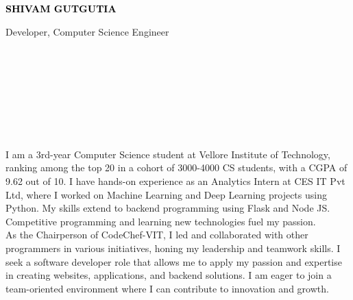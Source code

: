 \documentclass[9pt]{developercv}
\begin{document}

\begin{minipage}[t]{0.5\textwidth}
  \vspace{-\baselineskip}

  { \fontsize{16}{20} \textcolor{black}{\textbf{\MakeUppercase{Shivam Gutgutia}}}}

  \vspace{6pt}

  {\Large Developer, Computer Science Engineer}
\end{minipage}
\hfill
\begin{minipage}[t]{0.2\textwidth}
  \vspace{-\baselineskip}
  \\
  \\
  \\

\end{minipage}
\begin{minipage}[t]{0.27\textwidth}
  \vspace{-\baselineskip}

  \\
  \\
  \\

\end{minipage}


\vspace{-10pt}
\vspace{-10pt}

I am a 3rd-year Computer Science student at Vellore Institute of Technology, ranking among the top 20 in a cohort of 3000-4000 CS students, with a CGPA of 9.62 out of 10. I have hands-on experience as an Analytics Intern at CES IT Pvt Ltd, where I worked on Machine Learning and Deep Learning projects using Python. My skills extend to backend programming using Flask and Node JS. Competitive programming and learning new technologies fuel my passion. \\

As the Chairperson of CodeChef-VIT, I led and collaborated with other programmers in various initiatives, honing my leadership and teamwork skills. I seek a software developer role that allows me to apply my passion and expertise in creating websites, applications, and backend solutions. I am eager to join a team-oriented environment where I can contribute to innovation and growth.
\end{document}

